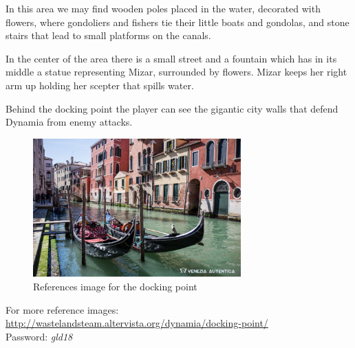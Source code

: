 In this area we may find wooden poles placed in the water, decorated with flowers, where gondoliers and fishers tie their little boats and gondolas, and  stone stairs that lead to small platforms on the canals.

In the center of the area there is a small street and a fountain which has in its middle a statue representing Mizar, surrounded by flowers. Mizar keeps her right arm up holding her scepter that spills water.

Behind the docking point the player can see the gigantic city walls that defend Dynamia from enemy attacks.

\begin{figure}[H]
  \centering
  \includegraphics[width=8cm]{Images/Landmarks/dockingPoint}
  \caption{References image for the docking point}
\end{figure}
For more reference images: \url{http://wastelandsteam.altervista.org/dynamia/docking-point/}\\
Password: \textit{gld18}
